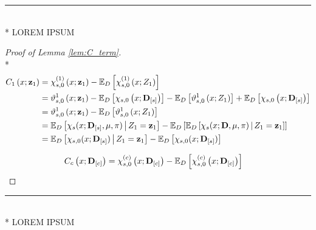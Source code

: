 \hrule

\begin{lem}\label{lem:C_term}\mbox{}\\*
    {\color{red} LOREM IPSUM}
\end{lem}

\begin{proof}[Proof of Lemma \ref{lem:C_term}]\mbox{}\\*
    \begin{equation}
        \begin{aligned}
            C_{1}\left(x; \mathbf{z}_1\right)
            & = \chi_{s,0}^{(1)}\left(x; \mathbf{z}_{1}\right) - \mathbb{E}_{D}\left[\chi_{s,0}^{(1)}\left(x; Z_1\right)\right] \\
            & = \vartheta_{s,0}^{1}\left(x; \mathbf{z}_{1}\right) 
            - \mathbb{E}_{D}\left[\chi_{s,0}\left(x; \mathbf{D}_{[s]}\right)\right]
            - \mathbb{E}_{D}\left[\vartheta_{s,0}^{1}\left(x; Z_{1}\right)\right]
            + \mathbb{E}_{D}\left[\chi_{s,0}\left(x; \mathbf{D}_{[s]}\right)\right]\\
            & = \vartheta_{s,0}^{1}\left(x; \mathbf{z}_{1}\right) 
            - \mathbb{E}_{D}\left[\vartheta_{s,0}^{1}\left(x; Z_{1}\right)\right] \\
            & = \mathbb{E}_{D}\left[\chi_{s}(x; \mathbf{D}_{[s]}, \mu, \pi) \, \middle| \, Z_1 = \mathbf{z}_1\right]
            - \mathbb{E}_{D}\left[\mathbb{E}_{D}\left[\chi_{s}(x; \mathbf{D}, \mu, \pi) \, \middle| \, Z_1 = \mathbf{z}_1\right]\right]\\
            & = \mathbb{E}_{D}\left[\chi_{s,0}(x; \mathbf{D}_{[s]}) \, \middle| \, Z_1 = \mathbf{z}_1\right]
            - \mathbb{E}_{D}\left[\chi_{s,0}(x; \mathbf{D}_{[s]})\right]
        \end{aligned}
    \end{equation}

    \begin{equation}
        \begin{aligned}
            C_{c}\left(x; \mathbf{D}_{[c]}\right)
            & = \chi_{s,0}^{(c)}\left(x; \mathbf{D}_{[c]}\right) - \mathbb{E}_{D}\left[\chi_{s,0}^{(c)}\left(x; \mathbf{D}_{[c]}\right)\right]
        \end{aligned}
    \end{equation}
\end{proof}

\hrule

\begin{lem}\label{lem:D_resid}\mbox{}\\*
    {\color{red} LOREM IPSUM}
\end{lem}

